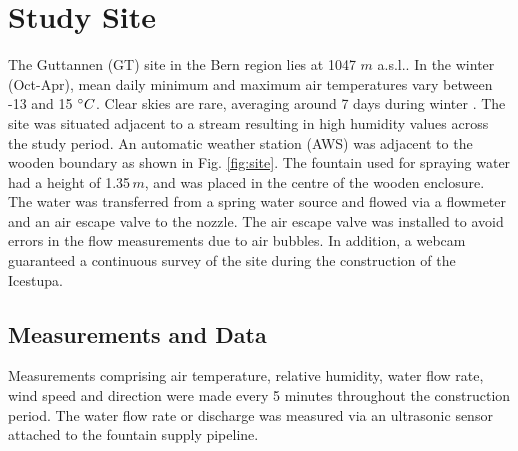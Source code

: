 \documentclass[utf8]{frontiersSCNS} %
\begin{document}
\section{Study Site}
The Guttannen (GT) site in the Bern region lies at 1047 $m$ a.s.l.. In the winter (Oct-Apr), mean daily minimum and maximum
air temperatures vary between -13 and 15 $\degree C$. Clear skies are rare, averaging around 7 days during winter
\citep{eispalast}. The site was situated adjacent to a stream resulting in high humidity values across the study period.
An automatic weather station (AWS) was adjacent to the wooden boundary as shown in Fig. \ref{fig:site}. The fountain
used for spraying water had a height of 1.35\,$m$, and was placed in the centre of the wooden enclosure. The water was
transferred from a spring water source and flowed via a flowmeter and an air escape valve to the nozzle. The air escape
valve was installed to avoid errors in the flow measurements due to air bubbles. In addition, a webcam guaranteed a
continuous survey of the site during the construction of the Icestupa. 




\subsection{Measurements and Data}
Measurements comprising air temperature, relative humidity, water flow rate, wind speed and direction were made every
5 minutes throughout the construction period. The water flow rate or discharge was measured via an ultrasonic
sensor attached to the fountain supply pipeline.   
\end{document}
